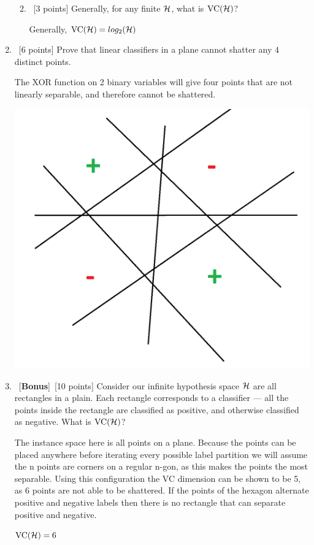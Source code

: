 \documentclass[12pt, fullpage,letterpaper]{article}
\begin{document}
\begin{enumerate}
\begin{enumerate}
		\bigskip
		\item~[3 points] Generally, for  any finite $\mathcal{H}$, what is $\mathrm{VC}(\mathcal{H})$?
		
		\bigskip
		Generally, $\mathrm{VC}(\mathcal{H}) = log_2(\mathcal{H})$
	\end{enumerate}
	\item~[6 points] Prove that linear classifiers in a plane cannot shatter any $4$ distinct points. 
	
	\bigskip
	The XOR function on 2 binary variables will give four points that are not linearly separable, and therefore cannot be shattered. 
	
	\begin{center}
		\includegraphics[scale=.5]{XOR_pic}
	\end{center}
	\bigskip
	\item~[\textbf{Bonus}]~[10 points] Consider our infinite hypothesis space $\mathcal{H}$ are all rectangles in a plain. Each rectangle corresponds to a classifier --- all the points inside the rectangle are classified as positive, and otherwise classified as negative. What is $\mathrm{VC}(\mathcal{H})$? 

	\bigskip
	The instance space here is all points on a plane. Because the points can be placed anywhere before iterating every possible label partition we will assume the n points are corners on a regular n-gon, as this makes the points the most separable. Using this configuration the VC dimension can be shown to be 5, as 6 points are not able to be shattered. If the points of the hexagon alternate positive and negative labels then there is no rectangle that can separate positive and negative.
	
	$\mathrm{VC}(\mathcal{H}) = 6$
\end{enumerate}
\end{document}
